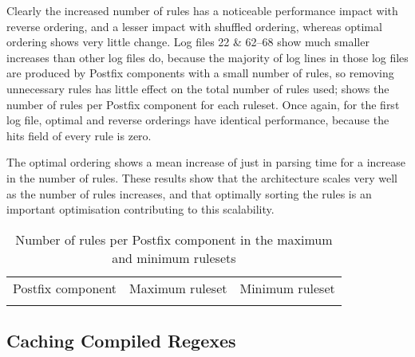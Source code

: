 Clearly the increased number of rules has a noticeable performance impact
with reverse ordering, and a lesser impact with shuffled ordering, whereas
optimal ordering shows very little change.  Log files 22 \& 62--68 show
much smaller increases than other log files do, because the majority of log
lines in those log files are produced by Postfix components with a small
number of rules, so removing unnecessary rules has little effect on the
total number of rules used;  shows the number of rules per Postfix
component for each ruleset.  Once again, for the first log file, optimal
and reverse orderings have identical performance, because the hits field of
every rule is zero.

The optimal ordering shows a mean increase of just
 in parsing time
for a \numberOFrulesMAXIMUMpercentage{} increase in the number of rules.
These results show that the architecture scales very well as the number of
rules increases, and that optimally sorting the rules is an important
optimisation contributing to this scalability.



\begin{table}[thbp]
    \caption{Number of rules per Postfix component in the maximum and
    minimum rulesets}
    \empty{}\label{Number of rules per Postfix component in the maximum and
    minimum rulesets}
    \centering{}
    \begin{tabular}{lrr}
        \tabletopline{}%
        Postfix component & Maximum ruleset & Minimum ruleset \\
        \tablemiddleline{}%
        
        \tablebottomline{}%
    \end{tabular}
\end{table}

\FloatBarrier{}

\subsection{Caching Compiled Regexes}

